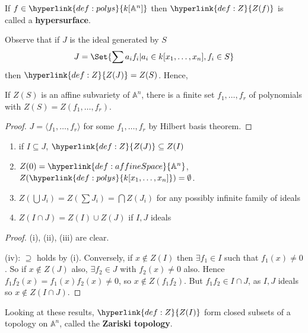 \documentclass{article}
\newcommand{\A}{\mathbb{A}}
\begin{document}
\begin{remark}
    If $f \in \hyperlink{def:polys}{k[\A^n]}$ then $\hyperlink{def:Z}{Z(f)}$ is called a \textbf{hypersurface}.
\end{remark}

Observe that if $J$ is the ideal generated by $S$
\begin{equation*}
    J = \Set{\sum a_i f_i | a_i \in k[x_1, \dotsc, x_n], f_i \in S}
\end{equation*}
then $\hyperlink{def:Z}{Z(J)} = Z(S)$.  Hence,
\begin{thm}
    If \hyperlink{def:Z}{$Z(S)$} is an affine subvariety of \hyperlink{def:affineSpace}{$\A^n$}, there is a finite set $f_1, \dotsc, f_r$ of polynomials with $Z(S) = Z(f_1, \dotsc, f_r)$.
\end{thm}

\begin{proof}
    $J = \langle f_1, \dotsc, f_r \rangle$ for some $f_1, \dotsc, f_r$ by Hilbert basis theorem.
\end{proof}

\begin{lemma}
    \leavevmode
    \begin{enumerate}[label=(\roman*)]
        \item if $I \subseteq J$, $\hyperlink{def:Z}{Z(J)} \subseteq Z(I)$
        \item $Z(0) = \hyperlink{def:affineSpace}{\A^n}$, $Z(\hyperlink{def:polys}{k[x_1, \dotsc, x_n]}) = \emptyset$.
        \item $Z\left(\bigcup J_i\right) = Z(\sum J_i) = \bigcap Z(J_i)$ for any possibly infinite family of ideals
        \item $Z(I \cap J) = Z(I) \cup Z(J)$ if $I, J$ ideals
    \end{enumerate}
\end{lemma}
\begin{proof}
    (i), (ii), (iii) are clear.

    (iv): $\supseteq$ holds by (i). Conversely, if $x \notin Z(I)$ then $\exists f_1 \in I$ such that $f_1(x) \neq 0$.
    So if $x \notin Z(J)$ also, $\exists f_2 \in J$ with $f_2(x) \neq 0$ also.
    Hence $f_1 f_2(x) = f_1(x) f_2(x) \neq 0$, so $x \notin Z(f_1 f_2)$. But $f_1 f_2 \in I \cap J$, as $I, J$ ideals so $x \notin Z(I \cap J)$.
\end{proof}

\begin{defi}
Looking at these results, $\hyperlink{def:Z}{Z(I)}$ form closed subsets of a topology on $\A^n$, called the \hypertarget{def:zariski}{\textbf{Zariski topology}}.
\end{defi}
\end{document}
